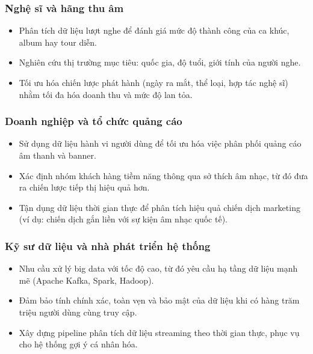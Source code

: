 \documentclass{../hcmut-report}
\begin{document}
\subsubsection{Nghệ sĩ và hãng thu âm}
\begin{itemize}
    \item Phân tích dữ liệu lượt nghe để đánh giá mức độ thành công của ca khúc, album hay tour diễn.

    \item Nghiên cứu thị trường mục tiêu: quốc gia, độ tuổi, giới tính của người nghe.

    \item Tối ưu hóa chiến lược phát hành (ngày ra mắt, thể loại, hợp tác nghệ sĩ) nhằm tối đa hóa doanh thu và mức độ lan tỏa.
\end{itemize}

\subsubsection{Doanh nghiệp và tổ chức quảng cáo}
\begin{itemize}
    \item Sử dụng dữ liệu hành vi người dùng để tối ưu hóa việc phân phối quảng cáo âm thanh và banner.

    \item Xác định nhóm khách hàng tiềm năng thông qua sở thích âm nhạc, từ đó đưa ra chiến lược tiếp thị hiệu quả hơn.

    \item Tận dụng dữ liệu thời gian thực để phân tích hiệu quả chiến dịch marketing (ví dụ: chiến dịch gắn liền với sự kiện âm nhạc quốc tế).
\end{itemize}

\subsubsection{Kỹ sư dữ liệu và nhà phát triển hệ thống}
\begin{itemize}
    \item Nhu cầu xử lý big data với tốc độ cao, từ đó yêu cầu hạ tầng dữ liệu mạnh mẽ (Apache Kafka, Spark, Hadoop).

    \item Đảm bảo tính chính xác, toàn vẹn và bảo mật của dữ liệu khi có hàng trăm triệu người dùng cùng truy cập.

    \item Xây dựng pipeline phân tích dữ liệu streaming theo thời gian thực, phục vụ cho hệ thống gợi ý cá nhân hóa.
\end{itemize}
\end{document}
